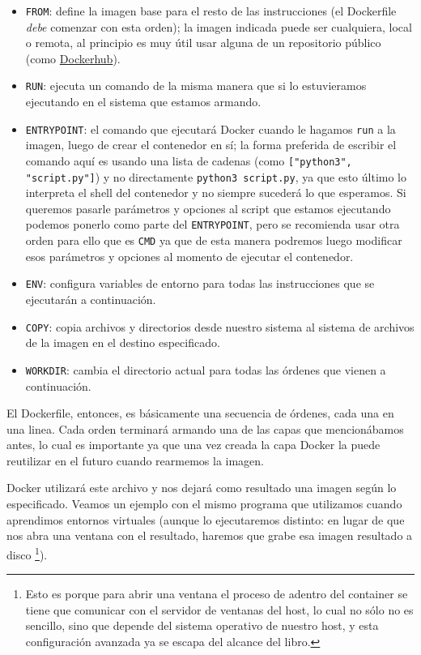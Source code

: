 \begin{itemize}
    \item \verb|FROM|: define la imagen base para el resto de las instrucciones (el Dockerfile \textit{debe} comenzar con esta orden); la imagen indicada puede ser cualquiera, local o remota, al principio es muy útil usar alguna de un repositorio público (como \href{https://hub.docker.com/search?q=&type=image}{Dockerhub}).
    \item \verb|RUN|: ejecuta un comando de la misma manera que si lo estuvieramos ejecutando en el sistema que estamos armando.
    \item \verb|ENTRYPOINT|: el comando que ejecutará Docker cuando le hagamos \verb|run| a la imagen, luego de crear el contenedor en sí; la forma preferida de escribir el comando aquí es usando una lista de cadenas (como \texttt{["python3", "script.py"]}) y no directamente \texttt{python3 script.py}, ya que esto último lo interpreta el shell del contenedor y no siempre sucederá lo que esperamos. Si queremos pasarle parámetros y opciones al script que estamos ejecutando podemos ponerlo como parte del \verb|ENTRYPOINT|, pero se recomienda usar otra orden para ello que es \verb|CMD| ya que de esta manera podremos luego modificar esos parámetros y opciones al momento de ejecutar el contenedor.
    \item \verb|ENV|: configura variables de entorno para todas las instrucciones que se ejecutarán a continuación.
    \item \verb|COPY|: copia archivos y directorios desde nuestro sistema al sistema de archivos de la imagen en el destino especificado.
    \item \verb|WORKDIR|: cambia el directorio actual para todas las órdenes que vienen a continuación.
\end{itemize}

El Dockerfile, entonces, es básicamente una secuencia de órdenes, cada una en una linea. Cada orden terminará armando una de las capas que mencionábamos antes, lo cual es importante ya que una vez creada la capa Docker la puede reutilizar en el futuro cuando rearmemos la imagen.

Docker utilizará este archivo y nos dejará como resultado una imagen según lo especificado. Veamos un ejemplo con el mismo programa que utilizamos cuando aprendimos entornos virtuales (aunque lo ejecutaremos distinto: en lugar de que nos abra una ventana con el resultado, haremos que grabe esa imagen resultado a disco \footnote{Esto es porque para abrir una ventana el proceso de adentro del container se tiene que comunicar con el servidor de ventanas del host, lo cual no sólo no es sencillo, sino que depende del sistema operativo de nuestro host, y esta configuración avanzada ya se escapa del alcance del libro.}).

